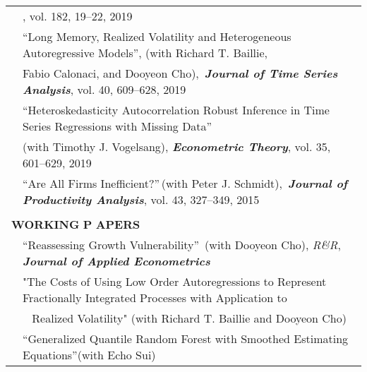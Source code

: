 \documentclass[10pt]{article}
\begin{document}
\begin{center}
\begin{tabular}{llllr}
 & \multicolumn{4}{l}{\hspace{0.2cm}{\bf\emph{Economics Letters}}, vol. 182, 19--22, 2019}  \vspace{0.1cm}\\
& \multicolumn{4}{l}{\textquotedblleft  Long Memory, Realized Volatility and Heterogeneous Autoregressive Models\textquotedblright, (with Richard T. Baillie,}\\
& \multicolumn{4}{l}{\hspace{0.2cm} Fabio Calonaci, and Dooyeon Cho),\, \emph{{\bf\emph{Journal of Time Series Analysis}}}, vol. 40, 609--628, 2019} \vspace{0.1cm}\\
 & \multicolumn{4}{l}{\textquotedblleft Heteroskedasticity Autocorrelation Robust Inference in Time Series Regressions with Missing Data\textquotedblright \ } \\
& \multicolumn{4}{l}{\hspace{0.2cm}(with Timothy J. Vogelsang), \emph{{\bf\emph {Econometric Theory}}}, vol. 35, 601--629, 2019}  \vspace{0.1cm}\\
& \multicolumn{4}{l}{\textquotedblleft Are All Firms Inefficient?\textquotedblright \,(with Peter J. Schmidt),\, {\bf\emph{Journal of Productivity Analysis}}, vol. 43, 327--349, 2015 } \\
\multicolumn{5}{p{500pt}}{}\\
\multicolumn{5}{l}{{\Large \textbf{W}}\textbf{ORKING} {\Large \textbf{P}}%
\textbf{APERS}} \vspace{0.1cm}\\
& \multicolumn{4}{l}{\textquotedblleft Reassessing Growth Vulnerability\textquotedblright \ (with Dooyeon Cho), \emph{R\&R}, {\bf\emph {Journal of Applied Econometrics}}} \vspace{0.1cm}\\
& \multicolumn{4}{l}{"The Costs of Using Low Order Autoregressions to Represent Fractionally Integrated Processes with Application to }\vspace{0.1cm}\\
& \multicolumn{4}{l}{\,\,\, Realized Volatility" (with Richard T. Baillie and Dooyeon Cho)} \vspace{0.1cm}\\
& \multicolumn{4}{l}{\textquotedblleft Generalized Quantile Random Forest with Smoothed Estimating Equations\textquotedblright (with Echo Sui)} \\

\end{tabular}
\end{center}
\end{document}
